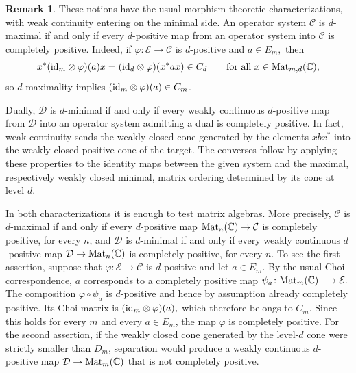 \documentclass[11pt,onecolumn]{article}
\theoremstyle{plain}
\theoremstyle{definition}
\newtheorem{remark}[remark]{Remark}
\begin{document}
\begin{remark}
    These notions have the usual morphism-theoretic characterizations, with weak
    continuity entering on the minimal side. An operator system $\mathcal C$
    is $d$-maximal if and only if every $d$-positive map from an operator
    system into $\mathcal C$ is completely positive. Indeed, if
    $\varphi\colon\mathcal E\to\mathcal C$ is $d$-positive and
    $a\in E_m,$ then
    \[
        x^*({\rm id}_m\otimes\varphi)(a)x=({\rm id}_d\otimes\varphi)(x^*ax)\in C_d
        \qquad\text{for all }x\in{\rm Mat}_{m,d}(\mathbb C),
    \]
    so $d$-maximality implies $({\rm id}_m\otimes\varphi)(a)\in C_m$.

    Dually, $\mathcal D$ is $d$-minimal if and only if every weakly
    continuous $d$-positive map from $\mathcal D$ into an operator system
    admitting a dual is completely positive. In fact, weak continuity sends
    the weakly closed cone generated by the elements $xbx^*$ into the weakly
    closed positive cone of the target. The converses follow by applying
    these properties to the identity maps between the given system and the
    maximal, respectively weakly closed minimal, matrix ordering determined
    by its cone at level $d$.

    In both characterizations it is enough to test matrix algebras. More
    precisely, $\mathcal C$ is $d$-maximal if and only if every $d$-positive
    map ${\rm Mat}_n(\mathbb C)\to\mathcal C$ is completely positive, for
    every $n$, and $\mathcal D$ is $d$-minimal if and only if every weakly
    continuous $d$-positive map
    $\mathcal D\to{\rm Mat}_n(\mathbb C)$ is completely positive, for every
    $n$. To see the first assertion, suppose that
    $\varphi\colon\mathcal E\to\mathcal C$ is $d$-positive and let
    $a\in E_m$. By the usual Choi correspondence, $a$ corresponds to a completely positive map
    \(
        \psi_a\colon{\rm Mat}_m(\mathbb C)\longrightarrow\mathcal E.
    \)
    The composition
    $\varphi\circ\psi_a$ is $d$-positive and hence by assumption already completely positive. Its Choi matrix is
    \(({\rm id}_m\otimes\varphi)(a),
    \)
    which therefore belongs to $C_m$. Since this holds for every $m$ and
    every $a\in E_m$, the map $\varphi$ is completely positive. For the
    second assertion, if the
    weakly closed cone generated by the level-$d$ cone were strictly smaller
    than $D_m$, separation would produce a weakly continuous $d$-positive map
    $\mathcal D\to{\rm Mat}_m(\mathbb C)$ that is not completely positive.
\end{remark}
\end{document}
